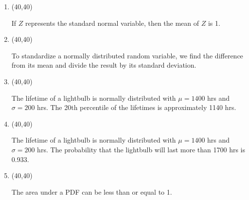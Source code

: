 \documentclass[11pt,twoside]{article}
\numberwithin{equation}{section}
\newcommand{\?}{\stackrel{?}{=}}
\newcommand{\gr}{\color{green!40!black}}
\begin{document}
\begin{enumerate}[\bf (i)]
\item \hfill
  \begin{minipage}{.1\linewidth}
    \framebox(40,40){ \gr  }
  \end{minipage}\quad
  \begin{minipage}{.85\linewidth}
    If $Z$ represents the standard normal variable, then the mean of $Z$ is 1.
   \end{minipage}
  
  \smallskip
  
\item \hfill
  \begin{minipage}{.1\linewidth}
    \framebox(40,40){\gr }
  \end{minipage}\quad
  \begin{minipage}{.85\linewidth}
    To standardize a normally distributed random variable, we find the difference from its mean and divide the result by
    its standard deviation.   
  \end{minipage}

  \smallskip
  
\item \hfill
  \begin{minipage}{.1\linewidth}
    \framebox(40,40){\gr  }
  \end{minipage}\quad
  \begin{minipage}{.85\linewidth}
    The lifetime of a lightbulb is normally distributed with $\mu=1400$ hrs and $\sigma=200$ hrs.
    The 20th percentile of the lifetimes is approximately 1140 hrs.
   \end{minipage}

  \smallskip
  
\item \hfill
  \begin{minipage}{.1\linewidth}
    \framebox(40,40){\gr  }
  \end{minipage}\quad
  \begin{minipage}{.85\linewidth}
    The lifetime of a lightbulb is normally distributed with $\mu=1400$ hrs and $\sigma=200$ hrs.
    The probability that the lightbulb will last more than 1700 hrs is 0.933.
  \end{minipage}

  \smallskip


  \item \hfill
    \begin{minipage}{.1\linewidth}
      \framebox(40,40){\gr  }
    \end{minipage}\quad
    \begin{minipage}{.85\linewidth}
      The area under a PDF can be less than or equal to 1.
     \end{minipage}
  
  \smallskip
  

\end{enumerate}
\end{document}
